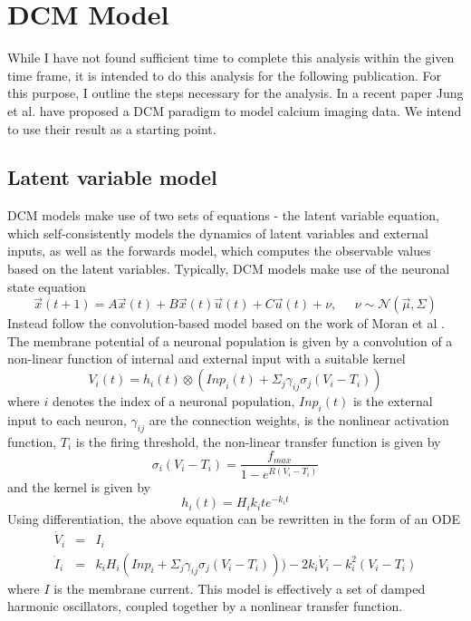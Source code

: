 \documentclass[a4paper,10pt]{article}
\begin{document}
\section{DCM Model}
While I have not found sufficient time to complete this analysis within the given time frame, it is intended to do this analysis for the following publication. For this purpose, I outline the steps necessary for the analysis. In a recent paper \cite{jung_dynamic_2019} Jung et al. have proposed a DCM paradigm to model calcium imaging data. We intend to use their result as a starting point.

\subsection{Latent variable model}
DCM models make use of two sets of equations - the latent variable equation, which self-consistently models the dynamics of latent variables and external inputs, as well as the forwards model, which computes the observable values based on the latent variables. Typically, DCM models make use of the neuronal state equation \cite{stephan_dynamic_2007}
\begin{equation}
   \vec{x}(t+1) = A\vec{x}(t) + B \vec{x}(t) \vec{u}(t) + C\vec{u}(t) + \nu, \;\;\;\;\; \nu \sim \mathcal{N}(\vec{\mu}, \Sigma)
\end{equation}
Instead \cite{jung_dynamic_2019} follow the convolution-based model based on the work of Moran et al \cite{moran_neural_2013} . The membrane potential of a neuronal population is given by a convolution of a non-linear function of internal and external input with a suitable kernel
\begin{equation}
   V_i(t) = h_{i}(t) \otimes (Inp_i(t) + \Sigma_j \gamma_{ij} \sigma_j(V_i - T_i))
\end{equation}
where $i$ denotes the index of a neuronal population, $Inp_i(t)$ is the external input to each neuron, $\gamma_{ij}$ are the connection weights,  is the nonlinear activation function, $T_i$ is the firing threshold, the non-linear transfer function is given by
\begin{equation}
   \sigma_i(V_i - T_i) = \frac{f_{max}}{1 - e^{R(V_i - T_i)}}
\end{equation}
and the kernel is given by
\begin{equation}
   h_i(t) = H_i k_i t e^{-k_i t}
\end{equation}
Using differentiation, the above equation can be rewritten in the form of an ODE
\begin{eqnarray}
\dot{V}_i &=& I_i \\
\dot{I}_i &=& k_i H_i (Inp_i + \Sigma_j \gamma_{ij} \sigma_j(V_i - T_i))) - 2k_i \dot{V}_i - k_i^2 (V_i - T_i)
\end{eqnarray}
where $I$ is the membrane current. This model is effectively a set of damped harmonic oscillators, coupled together by a nonlinear transfer function.
\end{document}

